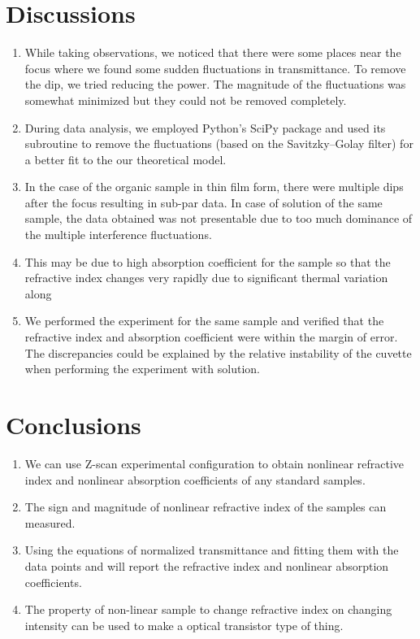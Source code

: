 \documentclass[%
 reprint,
 amsmath,amssymb,
 aps,
]{revtex4-2}
\begin{document}
\section{Discussions}
	\begin{enumerate}
		\item While taking observations, we noticed that there were
		some places near the focus where we found some sudden fluctuations in transmittance. To remove the dip, we
		tried reducing the power. The magnitude of the fluctuations was somewhat minimized but they could not be removed completely. 
		\item During data analysis, we employed Python's SciPy package and used its subroutine to remove the fluctuations (based on the Savitzky–Golay filter) for a better fit to the our theoretical model. 
		\item In the case of the organic sample in thin film form, there were multiple dips after the focus resulting in sub-par data. In case of solution of the same sample, the data obtained was not presentable due
		to too much dominance of the multiple interference
		fluctuations. 
		\item This may be due to high absorption coefficient
		for the sample so that the refractive index changes
		very rapidly due to significant thermal variation along
		\item We performed the experiment for the same sample and verified that the refractive index and absorption coefficient were within the margin of error. The discrepancies could be explained by the relative instability of the cuvette when performing the experiment with solution.
	\end{enumerate}
	
	
\section{Conclusions}
	\begin{enumerate}
		\item We can use Z-scan experimental configuration to obtain nonlinear refractive
		index and nonlinear absorption coefficients of any standard samples. 
		\item The
		sign and magnitude of nonlinear refractive index of the samples can measured. 
		\item Using the equations of normalized transmittance and fitting
		them with the data points and will report the refractive index and nonlinear
		absorption coefficients.
		\item The property of non-linear sample to change refractive index on changing intensity can be used to make a optical transistor
		type of thing.
	\end{enumerate}
\end{document}
